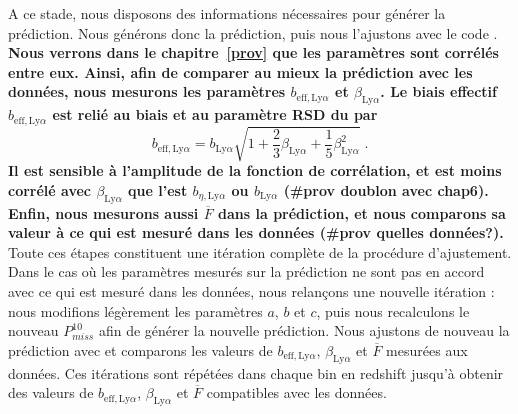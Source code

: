 \documentclass[11pt, twoside, a4paper, openright]{report}
\begin{document}
A ce stade, nous disposons des informations nécessaires pour générer la prédiction. Nous générons donc la prédiction, puis nous l'ajustons avec le code \picca{}.
\textbf{
Nous verrons dans le chapitre~\ref{prov} que les paramètres \lya{} sont corrélés entre eux.
Ainsi, afin de comparer au mieux la prédiction avec les données, nous mesurons les paramètres $b_{\mathrm{eff},\mathrm{Ly}\alpha}$ et $\beta_{\mathrm{Ly}\alpha}$.
Le biais effectif $b_{\mathrm{eff},\mathrm{Ly}\alpha}$ est relié au biais et au paramètre RSD du \lya{} par
\begin{equation}
  b_{\mathrm{eff},\mathrm{Ly}\alpha} = b_{\mathrm{Ly}\alpha} \sqrt{1 + \frac{2}{3} \beta_{\mathrm{Ly}\alpha} + \frac{1}{5} \beta_{\mathrm{Ly}\alpha}^2} \; .
\end{equation}
Il est sensible à l'amplitude de la fonction de corrélation, et est moins corrélé avec $\beta_{\mathrm{Ly}\alpha}$ que l'est $b_{\eta, \mathrm{Ly}\alpha}$ ou $b_{\mathrm{Ly}\alpha}$ (\#prov doublon avec chap6).
Enfin, nous mesurons aussi $\overline F$ dans la prédiction, et nous comparons sa valeur à ce qui est mesuré dans les données (\#prov quelles données?).}
Toute ces étapes constituent une itération complète de la procédure d'ajustement.
Dans le cas où les paramètres \lya{} mesurés sur la prédiction ne sont pas en accord avec ce qui est mesuré dans les données, nous relançons une nouvelle itération :
nous modifions légèrement les paramètres $a$, $b$ et $c$, puis nous recalculons le nouveau $P_{miss}^{10}$ afin de générer la nouvelle prédiction. Nous ajustons de nouveau la prédiction avec \picca{} et comparons les valeurs de $b_{\mathrm{eff},\mathrm{Ly}\alpha}$, $\beta_{\mathrm{Ly}\alpha}$ et $\overline F$ mesurées aux données. 
Ces itérations sont répétées dans chaque bin en redshift jusqu'à obtenir des valeurs de $b_{\mathrm{eff},\mathrm{Ly}\alpha}$, $\beta_{\mathrm{Ly}\alpha}$ et $\overline F$ compatibles avec les données.
\end{document}
